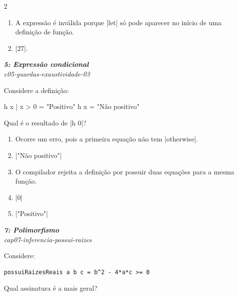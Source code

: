 \documentclass[a4paper,10pt,brazil]{article}
\begin{document}
\begin{multicols}{2}
\begin{enumerate}
  \item A expressão é inválida porque \haskellinline|let| só pode aparecer no início de uma definição de função.

  \item \haskellinline|27|.


\end{enumerate}

\begin{flushright}
  \footnotesize
  \textit{\textbf{5: Expressão condicional}}\\
  \textit{c05-guardas-exaustividade-03}\\

\end{flushright}
Considere a definição:
\begin{haskellcode}
h x
  | x > 0 = "Positivo"
h x = "Não positivo"
\end{haskellcode}
Qual é o resultado de \haskellinline|h 0|?

\begin{enumerate}
  \item Ocorre um erro, pois a primeira equação não tem \haskellinline|otherwise|.

  \item \haskellinline|"Não positivo"|

  \item O compilador rejeita a definição por possuir duas equações para a mesma função.

  \item \haskellinline|0|

  \item \haskellinline|"Positivo"|


\end{enumerate}

\begin{flushright}
  \footnotesize
  \textit{\textbf{7: Polimorfismo}}\\
  \textit{cap07-inferencia-possui-raizes}\\

\end{flushright}
Considere:

\begin{verbatim}
possuiRaizesReais a b c = b^2 - 4*a*c >= 0
\end{verbatim}

Qual assinatura é a mais geral?


\end{multicols}
\end{document}
